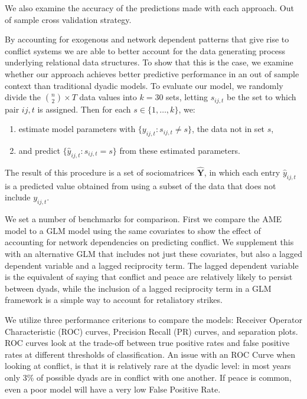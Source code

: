 \documentclass[12pt]{amsart}
\begin{document}
We also examine the accuracy of the predictions made with each approach. Out of sample cross validation strategy. 

By accounting for exogenous and network dependent patterns that give rise to conflict systems we are able to better account for the data generating process underlying relational data structures. To show that this is the case, we examine whether our approach achieves better predictive performance in an out of sample context than traditional dyadic models. To evaluate our model, we randomly divide the $\binom n 2 \times T$ data values into $k=30$ sets, letting $s_{ij,t}$ be the set to which pair $ij,t$ is assigned. Then for each $s \in \{1,\ldots,k\}$, we:

\begin{enumerate}
	\item estimate model parameters with $\{y_{ij,t}: s_{ij,t} \neq s\}$, the data not in set $s$,
	\item and predict $\{\hat{y}_{ij,t}: s_{ij,t} = s\}$ from these estimated parameters. 
\end{enumerate}

\noindent The result of this procedure is a set of sociomatrices $\bm \hat Y$, in which each entry $\hat y_{ij,t}$ is a predicted value obtained from using a subset of the data that does not include $y_{ij,t}$. 

We set a number of benchmarks for comparison. First we compare the AME model to a GLM model using the same covariates to show the effect of accounting for network dependencies on predicting conflict. We supplement this with an alternative GLM that includes not just these covariates, but also a lagged dependent variable and a lagged reciprocity term. The lagged dependent variable is the equivalent of saying that conflict and peace are relatively likely to persist between dyads, while the inclusion of a lagged reciprocity term in a GLM framework is a simple way to account for retaliatory strikes.

We utilize three performance criterions to compare the models: Receiver Operator Characteristic (ROC) curves, Precision Recall (PR) curves, and separation plots. ROC curves look at the trade-off between true positive rates and false positive rates at different thresholds of classification. An issue with an ROC Curve when looking at conflict, is that it is relatively rare at the dyadic level: in most years only 3\% of possible dyads are in conflict with one another. If peace is common, even a poor model will have a very low False Positive Rate. 
\end{document}
